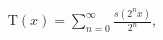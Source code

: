 \documentclass[preview]{standalone}
\begin{document}
\begin{align*}
\text{T}(x) = \sum_{n=0}^{\infty} \frac{s(2^n x)}{2^n},
\end{align*}
\end{document}
